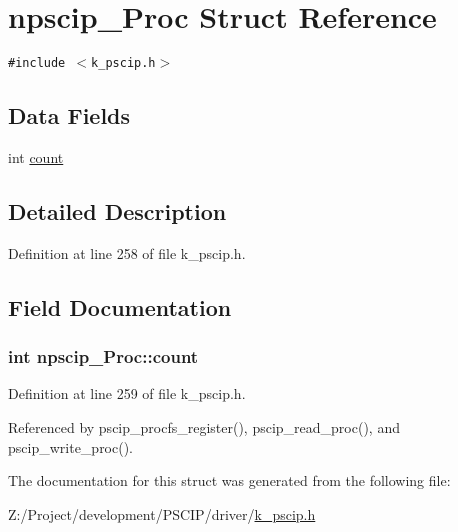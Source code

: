 \hypertarget{structnpscip___proc}{
\section{npscip\_\-Proc Struct Reference}
\label{structnpscip___proc}
}
{\tt \#include $<$k\_\-pscip.h$>$}

\subsection*{Data Fields}
\begin{CompactItemize}
\item 
int \hyperlink{structnpscip___proc_f65695c84ed0ca84dc082449eec1a4ae}{count}
\end{CompactItemize}


\subsection{Detailed Description}


Definition at line 258 of file k\_\-pscip.h.

\subsection{Field Documentation}
\hypertarget{structnpscip___proc_f65695c84ed0ca84dc082449eec1a4ae}{
\subsubsection[{count}]{\setlength{\rightskip}{0pt plus 5cm}int {\bf npscip\_\-Proc::count}}}
\label{structnpscip___proc_f65695c84ed0ca84dc082449eec1a4ae}




Definition at line 259 of file k\_\-pscip.h.

Referenced by pscip\_\-procfs\_\-register(), pscip\_\-read\_\-proc(), and pscip\_\-write\_\-proc().

The documentation for this struct was generated from the following file:\begin{CompactItemize}
\item 
Z:/Project/development/PSCIP/driver/\hyperlink{k__pscip_8h}{k\_\-pscip.h}\end{CompactItemize}
